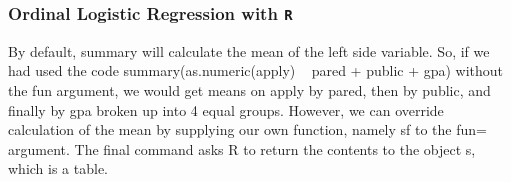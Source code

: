 \documentclass[00-GLMregslides.tex]{subfiles}
\begin{document}
\begin{frame}[fragile]
	
	\frametitle{Ordinal Logistic Regression with \texttt{R}}
	\Large
	
	By default, summary will calculate the mean of the left side variable. So, if we had used the code summary(as.numeric(apply) ~ pared + public + gpa) without the fun argument, we would get means on apply by pared, then by public, and finally by gpa broken up into 4 equal groups. However, we can override calculation of the mean by supplying our own function, namely sf to the fun= argument. The final command asks R to return the contents to the object s, which is a table.
\end{frame}
\end{document}
